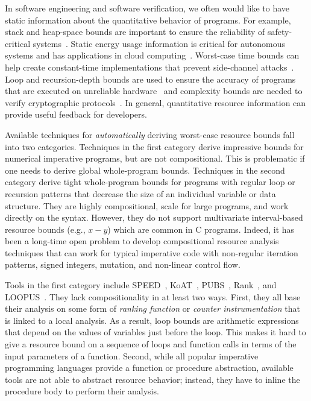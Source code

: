 \documentclass[nocopyrightspace,preprint,pldi]{sigplanconf-pldi15}
\begin{document}
In software engineering and software verification,
we often would like to have static information
about the quantitative behavior of programs.
For example, stack and heap-space bounds
are important to ensure the reliability of
safety-critical systems~\cite{Regehr05}.
Static energy usage information is critical
for autonomous systems and has applications in
cloud computing~\cite{CohenZSL12,CarrollH10}.
Worst-case time bounds can help create
constant-time implementations that prevent
side-channel attacks~\cite{KasperS09,BartheBCLP14}.
Loop and recursion-depth bounds are used to
ensure the accuracy of programs that are executed
on unreliable hardware~\cite{CarbinMR13} and
complexity bounds are needed to verify cryptographic
protocols~\cite{BartheGB09}.  In general, quantitative
resource information %
can provide useful
feedback for developers.





Available techniques for {\em automatically} deriving worst-case
resource bounds fall into two categories.  Techniques in the first
category derive impressive bounds for numerical imperative programs,
but are not compositional.  This is problematic if one needs to derive
global whole-program bounds.
Techniques in the second category derive
tight whole-program bounds for programs with regular loop or
recursion patterns that decrease the size of an individual variable or
data structure. They are highly compositional, scale for large
programs, and work directly on the syntax.  However,
they do not support multivariate interval-based resource bounds
(e.g., $x-y$) which are common in C programs. Indeed,
it has been a long-time open problem to develop compositional
resource analysis techniques that can work for typical imperative code
with non-regular iteration patterns, signed integers, mutation, and non-linear
control flow. %

Tools in the first category include
SPEED~\cite{GulwaniMC09}, KoAT~\cite{BrockschmidtEFFG14},
PUBS~\cite{AlbertAGPZ12}, Rank~\cite{AliasDFG10},
and LOOPUS~\cite{SinnZV14}.
They lack compositionality in at least two ways.
First, they all base their analysis on some form of
\emph{ranking function} or \emph{counter instrumentation}
that is linked to a local analysis.  As a result, loop bounds are
arithmetic expressions that depend on the values of
variables just before the loop.
This makes it hard to give a
resource bound on a sequence of loops and function calls in
terms of the input parameters of a function.
Second, while all popular imperative programming languages
provide a function or procedure abstraction, available
tools are not able to abstract resource behavior;
instead, they have to inline the procedure body to perform their
analysis.
\end{document}
